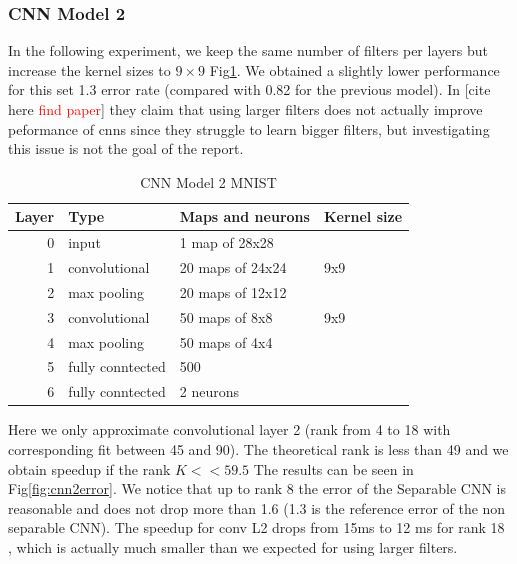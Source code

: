 \subsubsection{CNN Model 2}
In the following experiment, we keep the same number of filters per layers but increase the
kernel sizes to $9\times9$ Fig\ref{fig:CNN2}. We obtained a slightly lower performance for this set 1.3 error rate (compared with 0.82 for the previous model). In [cite here \textcolor{red}{find paper}]
they claim that using larger filters does not actually improve peformance of cnns since they struggle to learn bigger filters, but investigating this issue is not the goal of the report.
\begin{table}[h!]
\centering
\begin{tabular}{@{}rlll@{}}\toprule
Layer & Type & Maps and neurons& Kernel size \\ \midrule
0 & input & 1 map of 28x28 &\\
1& convolutional & 20 maps of 24x24 & 9x9\\
2 & max pooling & 20 maps of 12x12 &  \\
3 & convolutional & 50 maps of 8x8& 9x9 \\
4 & max pooling & 50 maps of 4x4&  \\ 
5 & fully conntected& 500 & \\
6 & fully conntected & 2 neurons & \\ \bottomrule
\end{tabular}
\caption{CNN Model 2  MNIST}
\label{fig:CNN2}
\end{table}
Here we only approximate convolutional layer 2 (rank from 4 to 18 with corresponding fit between 45 and 90). The theoretical rank is less than 49 and we obtain speedup if the rank $K << 59.5$
The results can be seen in Fig\ref{fig:cnn2error}. We notice that up to rank 8 the error of the Separable CNN is reasonable and does not drop more than 1.6 (1.3 is the reference error of the non separable CNN). The speedup for conv L2 drops from 15ms to 12 ms for rank 18 , which is actually much smaller than we expected for using larger filters.
